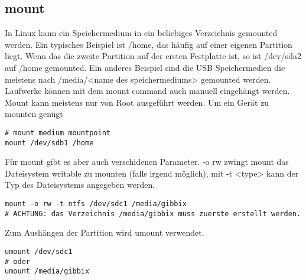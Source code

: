 \documentclass[10pt,paper=a4,final]{scrartcl}
\begin{document}
\subsection{mount}
In Linux kann ein Speichermedium in ein beliebiges Verzeichnis gemounted werden. Ein typisches Beispiel ist /home, das h\"aufig auf einer eigenen Partition liegt. Wenn das die zweite Partition auf der ersten Festplatte ist, so ist /dev/sda2 auf /home gemounted. Ein anderes Beispiel sind die USB Speichermedien die meistens nach /media/<name des speichermediums> gemounted werden.\\
Laufwerke k\"onnen mit dem mount command auch manuell eingeh\"angt werden. Mount kann meistens nur von Root ausgef\"uhrt werden. Um ein Ger\"at zu mounten gen\"ugt
\begin{lstlisting}[frame=single]
# mount medium mountpoint
mount /dev/sdb1 /home
\end{lstlisting}
F\"ur mount gibt es aber auch verschidenen Parameter. -o rw zwingt mount das Dateisystem writable zu mounten (falls irgend m\"oglich), mit -t <type> kann der Typ des Dateisystems angegeben werden.
\begin{lstlisting}[frame=single]
mount -o rw -t ntfs /dev/sdc1 /media/gibbix
# ACHTUNG: das Verzeichnis /media/gibbix muss zuerste erstellt werden.
\end{lstlisting}
Zum Aush\"angen der Partition wird umount verwendet.
\begin{lstlisting}[frame=single]
umount /dev/sdc1
# oder
umount /media/gibbix
\end{lstlisting}
\end{document}
